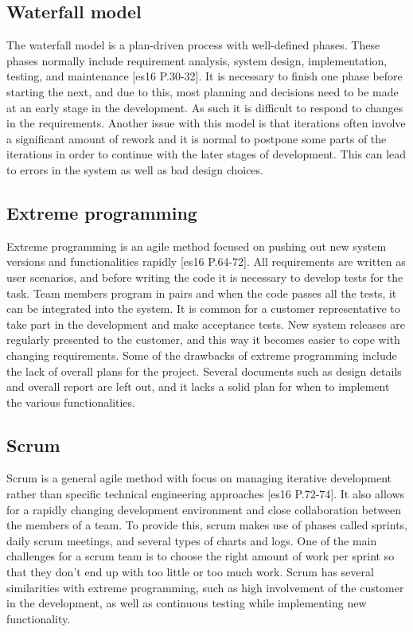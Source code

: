 \subsection{Waterfall model}
The waterfall model is a plan-driven process with well-defined phases. These phases normally include requirement analysis, system design, implementation, testing, and maintenance [es16 P.30-32]. It is necessary to finish one phase before starting the next, and due to this, most planning and decisions need to be made at an early stage in the development. As such it is difficult to respond to changes in the requirements. Another issue with this model is that iterations often involve a significant amount of rework and it is normal to postpone some parts of the iterations in order to continue with the later stages of development. This can lead to errors in the system as well as bad design choices.

\subsection{Extreme programming}
Extreme programming is an agile method focused on pushing out new system versions and functionalities rapidly [es16 P.64-72]. All requirements are written as user scenarios, and before writing the code it is necessary to develop tests for the task. Team members program  in pairs and when the code passes all the tests, it can be integrated into the system.  It is common for a customer representative to take part in the development and make acceptance tests. New system releases are regularly presented to the customer, and this way it becomes easier to cope with changing requirements. Some of the drawbacks of extreme programming include the lack of overall plans for the project. Several documents such as design details and overall report are left out, and it lacks a solid plan for when to implement the various functionalities.


\subsection{Scrum }
\label{sec_scrum}
Scrum is a general agile method with focus on managing iterative development rather than specific technical engineering approaches [es16 P.72-74]. It also allows for a rapidly changing development environment and close collaboration between the members of a team. To provide this, scrum makes use of phases called sprints, daily scrum meetings, and several types of charts and logs. One of the main challenges for a scrum team is to choose the right amount of work per sprint so that they don’t end up with too little or too much work. Scrum has several similarities with extreme programming, such as high involvement of the customer in the development, as well as continuous testing while implementing new functionality.

